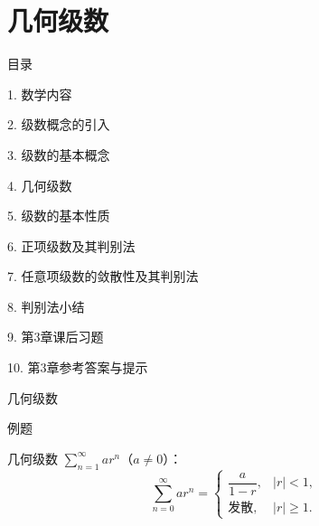 \documentclass[aspectratio=169,10pt,fontset=fandol]{ctexbeamer}
\begin{document}
\section{几何级数}
\begin{frame}[t,fragile]{目录}
\normalsize
{\color{black}\normalsize 1. 数学内容\par}\vspace{0.3em}
{\color{black}\normalsize 2. 级数概念的引入\par}\vspace{0.3em}
{\color{black}\normalsize 3. 级数的基本概念\par}\vspace{0.3em}
{\color{blue}\normalsize 4. 几何级数\par}\vspace{0.3em}
{\color{gray!40}\normalsize 5. 级数的基本性质\par}\vspace{0.3em}
{\color{gray!40}\normalsize 6. 正项级数及其判别法\par}\vspace{0.3em}
{\color{gray!40}\normalsize 7. 任意项级数的敛散性及其判别法\par}\vspace{0.3em}
{\color{gray!40}\normalsize 8. 判别法小结\par}\vspace{0.3em}
{\color{gray!40}\normalsize 9. 第3章课后习题\par}\vspace{0.3em}
{\color{gray!40}\normalsize 10. 第3章参考答案与提示\par}\vspace{0.3em}
\end{frame}
\begin{frame}[t,fragile]{几何级数}
\small
\begin{block}{例题}
{\small

几何级数 \(\sum\limits_{n = 1}^{  \infty } ar^n\)（\(a \neq 0\)）：
\[
\sum_{n=0}^{\infty} ar^n = 
\begin{cases}
\dfrac{a}{1-r}, & |r| < 1,\\[6pt]
\text{发散}, & |r| \geq 1.
\end{cases}
\]

}
\end{block}
\end{frame}
\end{document}
